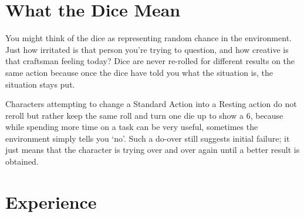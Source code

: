 \documentclass[titlepage,a4paper,openany]{book}
\begin{document}
\section{What the Dice Mean}

\begin{multicols}{2}

You might think of the dice as representing random chance in the environment. Just how irritated is that person you're trying to question, and how creative is that craftsman feeling today? Dice are never re-rolled for different results on the same action because once the dice have told you what the situation is, the situation stays put.

Characters attempting to change a Standard Action into a Resting action do not reroll but rather keep the same roll and turn one die up to show a 6, because while spending more time on a task can be very useful, sometimes the environment simply tells you `no'. Such a do-over still suggests initial failure; it just means that the character is trying over and over again until a better result is obtained.

\end{multicols}

\label{xp}\section{Experience}
\end{document}
